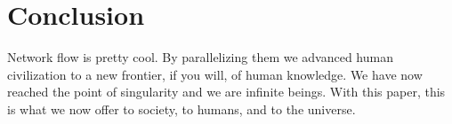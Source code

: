 \section{Conclusion}
Network flow is pretty cool. By parallelizing them we advanced human civilization to a new frontier, if you will, of human knowledge. We have now reached the point of singularity and we are infinite beings. With this paper, this is what we now offer to society, to humans, and to the universe.